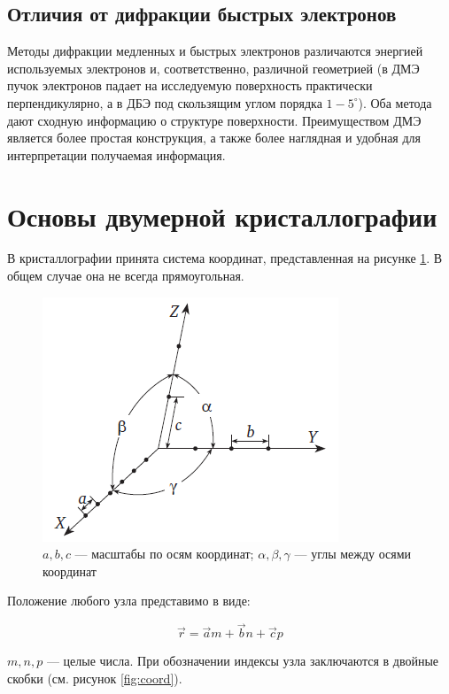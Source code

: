\documentclass[a4paper, 12pt]{article}
\begin{document}
\subsection{Отличия от дифракции быстрых электронов}

Методы дифракции медленных и быстрых электронов различаются энергией используемых электронов и, соответственно, различной геометрией (в ДМЭ пучок электронов падает на исследуемую поверхность практически перпендикулярно, а в ДБЭ под скользящим углом порядка $1-5 ^\circ$). Оба метода дают сходную информацию о структуре поверхности. Преимуществом ДМЭ является более простая конструкция, а также более наглядная и удобная для интерпретации получаемая информация.

\section{Основы двумерной кристаллографии}

В кристаллографии принята система координат, представленная на рисунке \ref{fig:coord_axes}. В общем случае она не всегда прямоугольная. 

\begin{figure}[H]
	\centering
	\includegraphics[width=0.5\linewidth]{Coord_axes}
	\caption{$a, b, c$ --- масштабы по осям координат; $\alpha, \beta, \gamma$ --- углы между осями координат}
	\label{fig:coord_axes}
\end{figure}

Положение любого узла представимо в виде:

\begin{equation*}
	\vec{r} = \vec{a}m + \vec{b}n + \vec{c}p
\end{equation*}

$m, n, p$ --- целые числа. При обозначении индексы узла заключаются в двойные скобки (см. рисунок \ref{fig:coord}).
\end{document}

